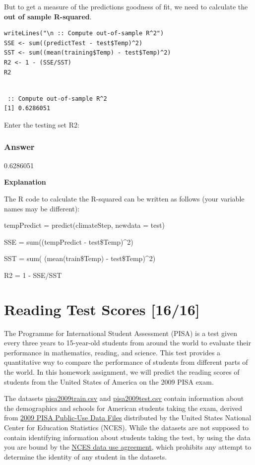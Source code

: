 \documentclass[letterpaper, 9pt, onecolumn, twoside, technote, final]{IEEEtran}
\begin{document}
But to get a measure of the predictions goodness of fit, we need to
calculate the \textbf{out of sample R-squared}.

\begin{verbatim}
writeLines("\n :: Compute out-of-sample R^2")
SSE <- sum((predictTest - test$Temp)^2)
SST <- sum((mean(training$Temp) - test$Temp)^2)
R2 <- 1 - (SSE/SST)
R2
\end{verbatim}

\begin{verbatim}

 :: Compute out-of-sample R^2
[1] 0.6286051
\end{verbatim}

Enter the testing set R2:

\subsubsection{Answer}
\label{sec-1-7-1}

0.6286051

\textbf{Explanation}

The R code to calculate the R-squared can be written as follows (your
variable names may be different):

tempPredict = predict(climateStep, newdata = test)

SSE = sum((tempPredict - test\$Temp)\^{}2)

SST = sum( (mean(train\$Temp) - test\$Temp)\^{}2)

R2 = 1 - SSE/SST

\section{Reading Test Scores [16/16]}
\label{sec-2}

The Programme for International Student Assessment (PISA) is a test
given every three years to 15-year-old students from around the world
to evaluate their performance in mathematics, reading, and
science. This test provides a quantitative way to compare the
performance of students from different parts of the world. In this
homework assignment, we will predict the reading scores of students
from the United States of America on the 2009 PISA exam.

The datasets \href{https://courses.edx.org/asset-v1:MITx\%2B15.071x_2a\%2B2T2015\%2Btype@asset\%2Bblock/pisa2009train.csv}{pisa2009train.csv} and \href{https://courses.edx.org/asset-v1:MITx\%2B15.071x_2a\%2B2T2015\%2Btype@asset\%2Bblock/pisa2009test.csv}{pisa2009test.csv} contain
information about the demographics and schools for American students
taking the exam, derived from \href{http://nces.ed.gov/pubsearch/pubsinfo.asp?pubid\%3D2011038}{2009 PISA Public-Use Data Files}
distributed by the United States National Center for Education
Statistics (NCES). While the datasets are not supposed to contain
identifying information about students taking the test, by using the
data you are bound by the \href{https://courses.edx.org/asset-v1:MITx\%2B15.071x_2a\%2B2T2015\%2Btype@asset\%2Bblock/NCES_Data_Use_Agreement.txt}{NCES data use agreement}, which prohibits any
attempt to determine the identity of any student in the datasets.
\end{document}
